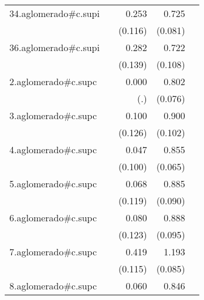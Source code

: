 {\begin{longtable}{l*{4}{D{.}{.}{-1}}}
\addlinespace
34.aglomerado#c.supi&                     &       0.253\sym{*}  &       0.725\sym{***}&                     \\
            &                     &     (0.116)         &     (0.081)         &                     \\
\addlinespace
36.aglomerado#c.supi&                     &       0.282\sym{*}  &       0.722\sym{***}&                     \\
            &                     &     (0.139)         &     (0.108)         &                     \\
\addlinespace
2.aglomerado#c.supc&                     &       0.000         &       0.802\sym{***}&                     \\
            &                     &         (.)         &     (0.076)         &                     \\
\addlinespace
3.aglomerado#c.supc&                     &       0.100         &       0.900\sym{***}&                     \\
            &                     &     (0.126)         &     (0.102)         &                     \\
\addlinespace
4.aglomerado#c.supc&                     &       0.047         &       0.855\sym{***}&                     \\
            &                     &     (0.100)         &     (0.065)         &                     \\
\addlinespace
5.aglomerado#c.supc&                     &       0.068         &       0.885\sym{***}&                     \\
            &                     &     (0.119)         &     (0.090)         &                     \\
\addlinespace
6.aglomerado#c.supc&                     &       0.080         &       0.888\sym{***}&                     \\
            &                     &     (0.123)         &     (0.095)         &                     \\
\addlinespace
7.aglomerado#c.supc&                     &       0.419\sym{***}&       1.193\sym{***}&                     \\
            &                     &     (0.115)         &     (0.085)         &                     \\
\addlinespace
8.aglomerado#c.supc&                     &       0.060         &       0.846\sym{***}&                     \\

\end{longtable}}
